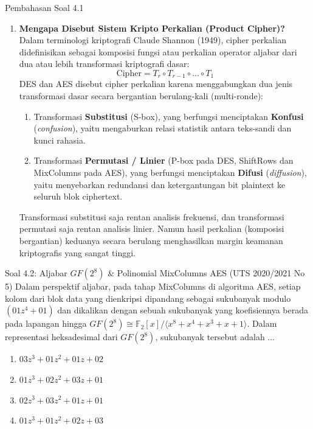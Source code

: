 \documentclass[11pt,a4paper]{article}
\begin{document}
\begin{solusibox}{Pembahasan Soal 4.1}
\begin{enumerate}[leftmargin=*]
\begin{itemize}
\begin{enumerate}
\begin{itemize}
            \end{itemize}
            \item \textbf{Ronde Terakhir (Ronde 10):} Sama seperti ronde standar, tetapi transformasi \textbf{MixColumns ditiadakan} (SubBytes $\to$ ShiftRows $\to$ AddRoundKey).
        \end{enumerate}
    \end{itemize}
    \item \textbf{Mengapa Disebut Sistem Kripto Perkalian (Product Cipher)?}
    Dalam terminologi kriptografi Claude Shannon (1949), cipher perkalian didefinisikan sebagai komposisi fungsi atau perkalian operator aljabar dari dua atau lebih transformasi kriptografi dasar:
    \[
    \text{Cipher} = T_r \circ T_{r-1} \circ \dots \circ T_1
    \]
    DES dan AES disebut cipher perkalian karena menggabungkan dua jenis transformasi dasar secara bergantian berulang-kali (multi-ronde):
    \begin{enumerate}
        \item Transformasi \textbf{Substitusi} (S-box), yang berfungsi menciptakan \textbf{Konfusi} (\textit{confusion}), yaitu mengaburkan relasi statistik antara teks-sandi dan kunci rahasia.
        \item Transformasi \textbf{Permutasi / Linier} (P-box pada DES, ShiftRows dan MixColumns pada AES), yang berfungsi menciptakan \textbf{Difusi} (\textit{diffusion}), yaitu menyebarkan redundansi dan ketergantungan bit plaintext ke seluruh blok ciphertext.
    \end{enumerate}
    Transformasi substitusi saja rentan analisis frekuensi, dan transformasi permutasi saja rentan analisis linier. Namun hasil perkalian (komposisi bergantian) keduanya secara berulang menghasilkan margin keamanan kriptografis yang sangat tinggi.
\end{enumerate}
\end{solusibox}

\vspace{0.4cm}

\begin{soalbox}{Soal 4.2: Aljabar $GF(2^8)$ \& Polinomial MixColumns AES (UTS 2020/2021 No 5)}
Dalam perspektif aljabar, pada tahap MixColumns di algoritma AES, setiap kolom dari blok data yang dienkripsi dipandang sebagai sukubanyak modulo $(01 z^4 + 01)$ dan dikalikan dengan sebuah sukubanyak yang koefisiennya berada pada lapangan hingga $GF(2^8) \cong \mathbb{F}_2[x] / \langle x^8 + x^4 + x^3 + x + 1 \rangle$.
Dalam representasi heksadesimal dari $GF(2^8)$, sukubanyak tersebut adalah ...
\begin{enumerate}[label=(\alph*)]
    \item $03 z^3 + 01 z^2 + 01 z + 02$
    \item $01 z^3 + 02 z^2 + 03 z + 01$
    \item $02 z^3 + 03 z^2 + 01 z + 01$
    \item $01 z^3 + 01 z^2 + 02 z + 03$
\end{enumerate}
\end{soalbox}
\end{document}

